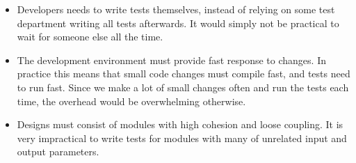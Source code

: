 \begin{itemize}
    \item Developers needs to write tests themselves, instead of relying
          on some test department writing all tests afterwards. It would
          simply not be practical to wait for someone else all the time.

    \item The development environment must provide fast response to changes.
          In practice this means that small code changes must compile fast,
          and tests need to run fast. Since we make a lot of small changes
          often and run the tests each time, the overhead would be overwhelming
          otherwise.

    \item Designs must consist of modules with high cohesion and loose coupling.
          It is very impractical to write tests for modules with many of
          unrelated input and output parameters.
\end{itemize}



